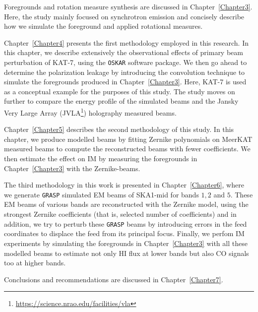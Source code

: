 Foregrounds and rotation measure synthesis are discussed in Chapter~\ref{Chapter3}. Here, the study mainly focused on synchrotron
emission and concisely describe how we simulate the foreground and applied rotational measures. 


Chapter~\ref{Chapter4} presents the first methodology employed in this research. In this chapter, we describe extensively the observational effects of primary beam perturbation 
of KAT-7, using the {\tt OSKAR} software package. We then go ahead to determine the polarization leakage by introducing the convolution technique to simulate the foregrounds produced 
in Chapter~\ref{Chapter3}. Here, KAT-7 is used as a conceptual example for the purposes of this study. The study moves on further to compare the energy profile of the  simulated beams and the  Jansky Very Large Array (JVLA\footnote{\url{https://science.nrao.edu/facilities/vla}}) holography measured beams. 

Chapter~\ref{Chapter5} describes the second methodology of this study. In this chapter, we produce modelled beams by fitting Zernike polynomials on MeerKAT measured beams 
to compute the reconstructed beams with fewer coefficients. We then estimate the effect on IM by measuring the foregrounds in Chapter~\ref{Chapter3} with the Zernike-beams.

The third methodology in this work is presented in Chapter~\ref{Chapter6}, where we generate {\tt GRASP} simulated EM beams of SKA1-mid for bands $1, 2$ and $5$. 
These EM beams of various bands are reconstructed with the Zernike model, using the strongest Zernike coefficients (that is, selected number of coefficients) and in addition, 
we try to perturb these {\tt GRASP} beams by introducing errors in the feed coordinates to displace the feed from its principal focus. 
Finally, we perfom IM experiments by simulating the foregrounds in Chapter~\ref{Chapter3} with all these modelled beams to estimate not only HI flux at lower bands 
but also CO signals too at higher bands.


Conclusions and recommendations are discussed in Chapter~\ref{Chapter7}.
